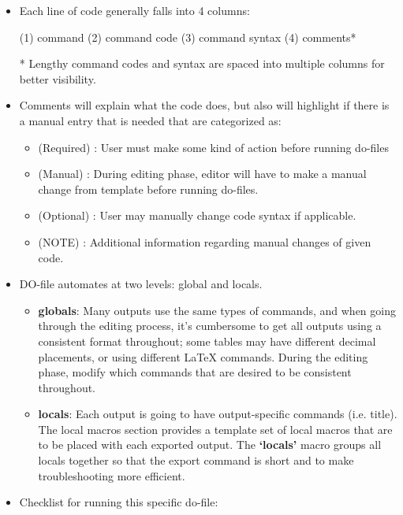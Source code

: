 \documentclass[12pt]{article}
\begin{document}
\begin{itemize}


\item Each line of code generally falls into 4 columns:

(1) command (2) command code (3) command syntax (4) comments*
 
* Lengthy command codes and syntax are spaced into multiple columns for better visibility.



\item Comments will explain what the code does, but also will highlight if there is a manual entry that is needed that are categorized as:

\begin{itemize}
\item (Required)  : User must make some kind of action before running do-files
\item (Manual)   	: During editing phase, editor will have to make a manual change from template before running do-files.
\item (Optional)    	: User may manually change code syntax if applicable.
\item (NOTE)        	: Additional information regarding manual changes of given code.
\end{itemize}

\item DO-file automates at two levels: global and locals.

\begin{itemize}
\item \textbf{globals}: Many outputs use the same types of commands, and when going through the editing process, it's cumbersome to get all outputs using a consistent format throughout; some tables may have different decimal placements, or using different LaTeX commands. During the editing phase, modify which commands that are desired to be consistent throughout.

\item \textbf{locals}: Each output is going to have output-specific commands (i.e. title). The local macros section provides a template set of local macros that are to be placed with each exported output. The \textbf{`locals'} macro groups all locals together so that the export command is short and to make troubleshooting more efficient.
\end{itemize}

\item Checklist for running this specific do-file: 
\begin{itemize}


\end{itemize}
\end{itemize}
\end{document}
